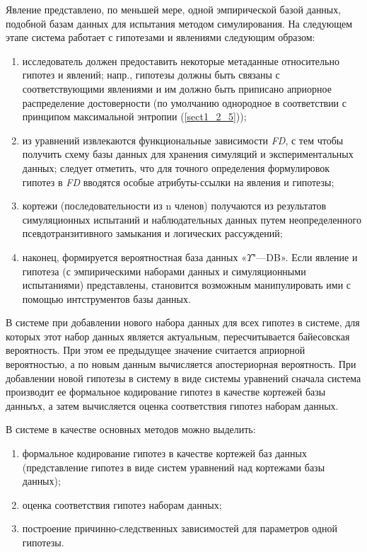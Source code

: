 Явление представлено, по меньшей мере, одной эмпирической базой данных, подобной базам данных для испытания методом 
симулирования. На следующем этапе система работает с гипотезами и явлениями следующим образом: 
\begin{enumerate}
    \item исследователь должен предоставить некоторые метаданные относительно гипотез и явлений; напр., гипотезы должны 
            быть связаны с соответствующими явлениями и им должно быть приписано априорное распределение достоверности 
            (по умолчанию однородное в соответствии с принципом максимальной энтропии (\cref{sect1_2_5}));
    \item из уравнений извлекаются функциональные зависимости \textit{FD}, с тем чтобы получить схему базы данных для 
            хранения симуляций и экспериментальных данных; следует отметить, что для точного определения формулировок 
            гипотез в \textit{FD} вводятся особые атрибуты-ссылки на явления и гипотезы; 
    \item кортежи (последовательности из n членов) получаются из результатов симуляционных испытаний и наблюдательных 
            данных путем неопределенного псевдотранзитивного замыкания и логических рассуждений;
    \item наконец, формируется вероятностная база данных «$\Upsilon$"---DB». Если явление и гипотеза 
            (с эмпирическими наборами данных и симуляционными испытаниями) представлены, становится возможным 
            манипулировать ими с помощью интструментов базы данных.
\end{enumerate}

В системе при добавлении нового набора данных для всех гипотез в системе, для которых этот набор данных является 
актуальным, пересчитывается байесовская вероятность. При этом ее предыдущее значение считается априорной вероятностью, 
а по новым данным вычисляется апостериорная вероятность. При добавлении новой гипотезы в систему в виде системы 
уравнений сначала система производит ее формальное кодирование гипотез в качестве кортежей базы данныъх, а затем 
вычисляется оценка соответствия гипотез наборам данных.

В системе в качестве основных методов можно выделить:
\begin{enumerate}
    \item формальное кодирование гипотез в качестве кортежей баз данных (представление гипотез в виде систем 
            уравнений над кортежами базы данных);
    \item оценка соответствия гипотез наборам данных;
    \item построение причинно-следственных зависимостей для параметров одной гипотезы.
\end{enumerate}


